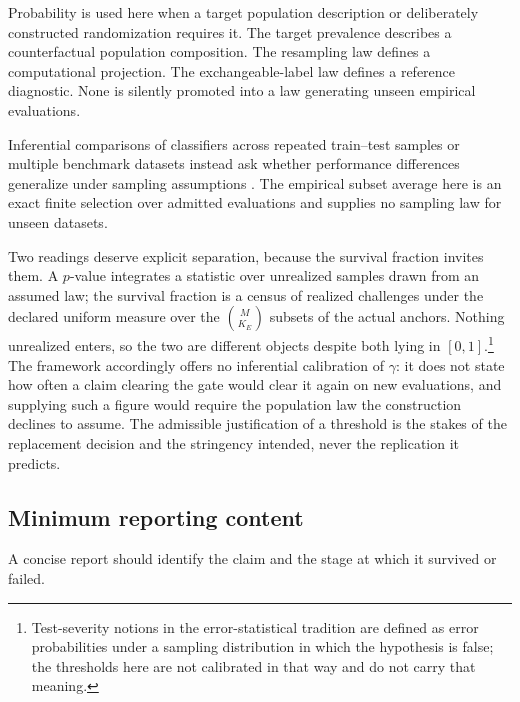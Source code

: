 \documentclass[11pt]{article}
\theoremstyle{remark}
\begin{document}
Probability is used here when a target population description or deliberately
constructed randomization requires it. The target prevalence describes a
counterfactual population composition. The resampling law defines a
computational projection. The exchangeable-label law defines a reference
diagnostic. None is silently promoted into a law generating unseen empirical
evaluations.

Inferential comparisons of classifiers across repeated train--test samples or
multiple benchmark datasets instead ask whether performance differences
generalize under sampling assumptions
\cite{nadeau2003inference,bouckaert2004estimating,demsar2006statistical}. The
empirical subset average here is an exact finite selection over admitted
evaluations and supplies no sampling law for unseen datasets.

Two readings deserve explicit separation, because the survival fraction invites
them. A $p$-value integrates a statistic over unrealized samples drawn from an
assumed law; the survival fraction is a census of realized challenges under the
declared uniform measure over the $\binom{M}{K_E}$ subsets of the actual
anchors. Nothing unrealized enters, so the two are different objects despite
both lying in $[0,1]$.\footnote{Test-severity notions in the error-statistical
tradition are defined as error probabilities under a sampling distribution in
which the hypothesis is false; the thresholds here are not calibrated in that
way and do not carry that meaning.} The framework accordingly offers no
inferential calibration of $\gamma$: it does not state how often a claim
clearing the gate would clear it again on new evaluations, and supplying such a
figure would require the population law the construction declines to assume. The
admissible justification of a threshold is the stakes of the replacement
decision and the stringency intended, never the replication it predicts.

\subsection{Minimum reporting content}

A concise report should identify the claim and the stage at which it survived
or failed.
\end{document}
